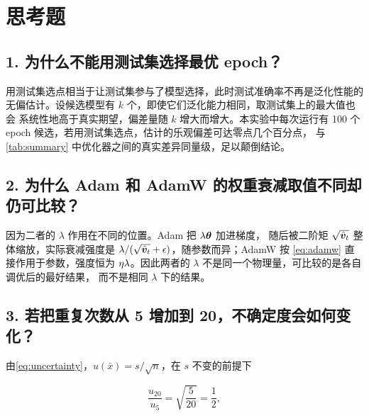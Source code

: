 \section{思考题}
\label{sec:questions}

\subsection*{1. 为什么不能用测试集选择最优 epoch？}

用测试集选点相当于让测试集参与了模型选择，此时测试准确率不再是泛化性能的
无偏估计。设候选模型有 $k$ 个，即使它们泛化能力相同，取测试集上的最大值也会
系统性地高于真实期望，偏差量随 $k$ 增大而增大。本实验中每次运行有
\num{100} 个 epoch 候选，若用测试集选点，估计的乐观偏差可达零点几个百分点，
与\cref{tab:summary} 中优化器之间的真实差异同量级，足以颠倒结论。

\subsection*{2. 为什么 Adam 和 AdamW 的权重衰减取值不同却仍可比较？}

因为二者的 $\lambda$ 作用在不同的位置。Adam 把 $\lambda \bm{\theta}$ 加进梯度，
随后被二阶矩 $\sqrt{\hat{\bm{v}}_t}$ 整体缩放，实际衰减强度是
$\lambda / (\sqrt{\hat{\bm{v}}_t} + \epsilon)$，随参数而异；AdamW 按
\cref{eq:adamw} 直接作用于参数，强度恒为 $\eta\lambda$。因此两者的
$\lambda$ 不是同一个物理量，可比较的是各自调优后的最好结果，
而不是相同 $\lambda$ 下的结果。

\subsection*{3. 若把重复次数从 5 增加到 20，不确定度会如何变化？}

由\cref{eq:uncertainty}，$u(\bar{x}) = s / \sqrt{n}$，在 $s$ 不变的前提下

\begin{equation}
  \label{eq:u-scaling}
  \frac{u_{20}}{u_{5}} = \sqrt{\frac{5}{20}} = \frac{1}{2},
\end{equation}

